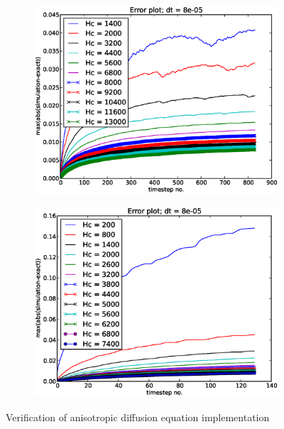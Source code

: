 \begin{figure}[H]
\centering
\begin{subfigure}[b]{0.48\textwidth}
\includegraphics[width=\textwidth]{../doc/results/experiment_02122013_1229/results/errorplot.eps}
\caption{}
\label{errorplot_FE1D_Walk_first_attemt_2d:few_walkers}
\end{subfigure}
\begin{subfigure}[b]{0.48\textwidth}
\includegraphics[width=\textwidth]{../doc/results/experiment_02122013_1223/results/errorplot.eps}
\caption{}
\label{errorplot_FE1D_Walk_first_attemt_2d:many_walkers}
\end{subfigure}
\caption[Verification of anisotropic diffusion equation implementation]{Verification of anisotropic diffusion equation implementation}
\label{errorplot_FE1D_Walk_first_attemt_2d}
\end{figure}

